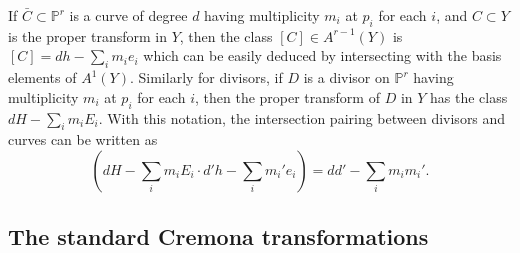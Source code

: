 \documentclass[12pt]{article}
\numberwithin{equation}{section}
\numberwithin{subeq}{equation}
\def\bbP{\mathbb{P}}
\begin{document}

If $\bar{C} \subset \bbP^r$ is a curve of degree $d$
having multiplicity $m_i$ at $p_i$ for each $i$,
and $C \subset Y$ is the proper transform in $Y$,
then the class $[C] \in A^{r-1}(Y)$ is
$
[C] = d h - \sum_i m_i e_{i}
$
which can be easily deduced by intersecting with the basis elements of $A^1(Y)$.
Similarly for divisors, if $D$ is a divisor on $\bbP^r$
having multiplicity $m_i$ at $p_i$ for each $i$,
then the proper transform of $D$ in $Y$ has the class $d H - \sum_i m_i E_i$.
With this notation, the intersection pairing between divisors and curves can be written as
\[
(d H - \sum_i m_i E_i \cdot d' h - \sum_i m_i' e_i) = dd' - \sum_i m_i m_i'.
\]

\subsection{The standard Cremona transformations}\label{standardCremona}
\end{document}
